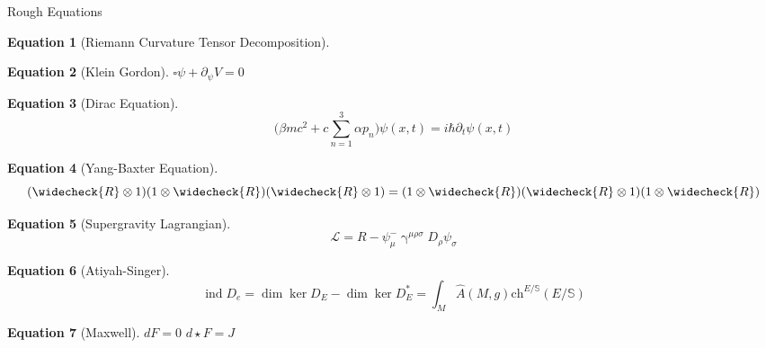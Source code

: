 \documentclass{article}
\theoremstyle{definition}
\newtheorem{equation1}{Equation}
\DeclareMathOperator{\ind}{ind}
\begin{document}
\begin{section}{Rough Equations}
\begin{equation1}[Riemann Curvature Tensor Decomposition]
  \end{equation1}

  \begin{equation1}[Klein Gordon]
    $\square \psi + \partial_{\psi}V = 0$
  \end{equation1}
  
  \begin{equation1}[Dirac Equation]
    $$\Big(\beta mc^2 + c\sum^{3}_{n=1}\alpha p_n \Big)\psi(x,t) = i\hbar \partial_t \psi(x,t)$$
  \end{equation1}

  \begin{equation1}[Yang-Baxter Equation]
    $$ ( \widecheck{R} \otimes 1)(1 \otimes \widecheck{R})(\widecheck{R} \otimes 1) = (1 \otimes \widecheck{R})(\widecheck{R} \otimes 1)(1 \otimes \widecheck{R})$$
  \end{equation1}

  \begin{equation1}[Supergravity Lagrangian]
    $$\mathscr{L} = R - \psi^-_\mu \upgamma^{\mu \rho \sigma}D_\rho \psi_{\sigma}$$
  \end{equation1}

  \begin{equation1}[Atiyah-Singer]
    $$\ind{D_e} = \dim \ker D_E - \dim \ker D_E^* = \int_M \hat A(M,g) \text{ch}^{E/\mathbb{S}}(E/\mathbb{S}) $$
  \end{equation1}

  \begin{equation1}[Maxwell]
    $dF  = 0$
    \newline $d \star F = J$
  \end{equation1}

\end{section}
\end{document}

